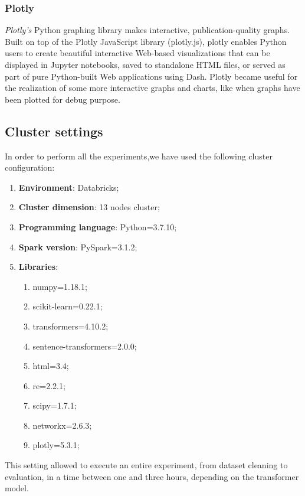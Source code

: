\documentclass[\main/main.tex]{subfiles}
\begin{document}
\subsubsection{Plotly}
\emph{Plotly's} \cite{plotly} Python graphing library makes interactive, publication-quality graphs. Built on top of the Plotly JavaScript library (plotly.js), plotly enables Python users to create beautiful interactive Web-based visualizations that can be displayed in Jupyter notebooks, saved to standalone HTML files, or served as part of pure Python-built Web applications using Dash. Plotly became useful for the realization of some more interactive graphs and charts, like when graphs have been plotted for debug purpose.
\subsection{Cluster settings}
In order to perform all the experiments,we have used the following cluster configuration:
\begin{enumerate}
    \item \textbf{Environment}: Databricks;
    \item \textbf{Cluster dimension}: 13 nodes cluster;
    \item \textbf{Programming language}: Python=3.7.10;
    \item \textbf{Spark version}: PySpark=3.1.2;
    \item \textbf{Libraries}: 
        \begin{enumerate}
            \item numpy=1.18.1;
            \item scikit-learn=0.22.1;
            \item transformers=4.10.2;
            \item sentence-transformers=2.0.0;
            \item html=3.4;
            \item re=2.2.1;
            \item scipy=1.7.1;
            \item networkx=2.6.3;
            \item plotly=5.3.1;
        \end{enumerate}
\end{enumerate}
This setting allowed to execute an entire experiment, from dataset cleaning to evaluation, in a time between one and three hours, depending on the transformer model.
\end{document}
